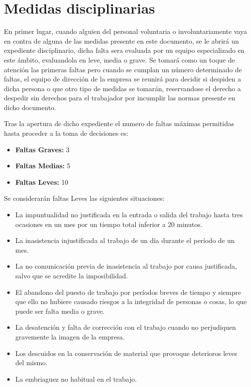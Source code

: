 \documentclass[11pt,bibtotoc,noliststotoc,BCOR0mm]{scrbook}
\begin{document}
\section{Medidas disciplinarias}

En primer lugar, cuando alguien del personal voluntaria o involuntariamente vaya en contra de alguna de las medidas presente en este documento, se le abrirá un expediente disciplinario, dicha falta sera evaluada por un equipo especializado en este ámbito, evaluandola en leve, media o grave. Se tomará como un toque de atención las primeras faltas pero cuando se cumplan un número determinado de faltas, el equipo de dirección de la empresa se reunirá para decidir si despiden a dicha persona o que otro tipo de medidas se tomarán, reservandose el derecho a despedir sin derechos para el trabajador por incumplir las normas presente en dicho documento.

Tras la apertura de dicho expediente el numero de faltas máximas permitidas hasta proceder a la toma de decisiones es:
\begin{itemize}
\item \textbf{Faltas Graves:} 3
\item \textbf{Faltas Medias:} 5
\item \textbf{Faltas Leves:} 10
\end{itemize}

Se considerarán faltas Leves las siguientes situaciones:
\begin{itemize}
\item La impuntualidad no justificada en la entrada o salida del trabajo hasta tres ocasiones en un mes por un tiempo total inferior a 20 minutos.
\item La inasistencia injustificada al trabajo de un día durante el período de un mes.
\item La no comunicación previa de inasistencia al trabajo por causa justificada, salvo que se acredite la imposibilidad.
\item El abandono del puesto de trabajo por períodos breves de tiempo y siempre que ello no hubiere causado riesgos a la integridad de personas o cosas, lo que puede ser falta media o grave.
\item La desatención y falta de corrección con el trabajo cuando no perjudiquen gravemente la imagen de la empresa.
\item Los descuidos en la conservación de material que provoque deterioros leves del mismo.
\item La embriaguez no habitual en el trabajo.
\end{itemize}
\end{document}
